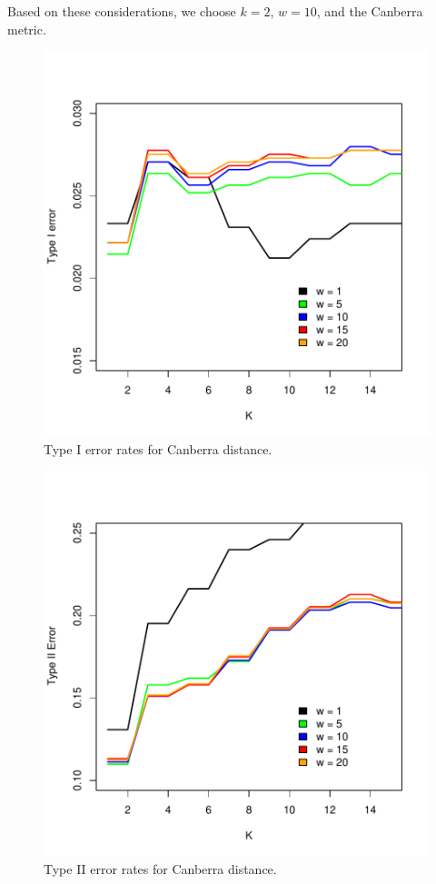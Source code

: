 Based on these considerations, we choose $k = 2$, $w = 10$, and the 
Canberra metric.

\begin{figure}
\includegraphics{Spam/knnTypeI.pdf}
\caption{Type I error rates for Canberra distance.}
\label{fig:knnTypeI}
\end{figure}

\begin{figure}
\includegraphics{Spam/knnTypeII.pdf}
\caption{Type II error rates for Canberra distance.}
\label{fig:knnTypeII}
\end{figure}


